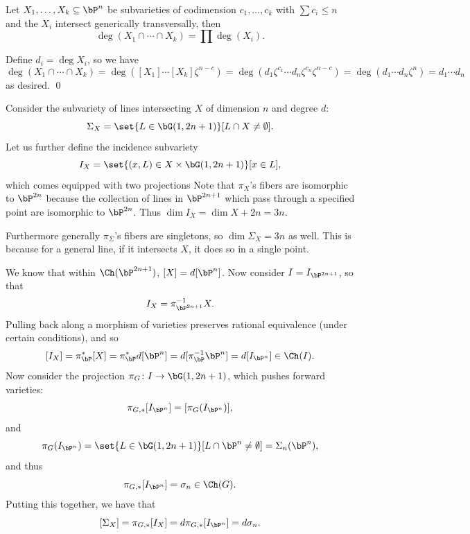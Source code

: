 \eproof

\bcoro[title={B\'ezout}]

    Let $X_1,\dots,X_k\subseteq\bP^n$ be subvarieties of codimension $c_1,\dots,c_k$ with $\sum c_i\leq n$ and the $X_i$ intersect
    generically transversally, then
    $$ \deg(X_1\cap\cdots\cap X_k) = \prod\deg(X_i) . $$

\ecoro

\bproof

    Define $d_i=\deg X_i$, so we have
    $$ \deg(X_1\cap\cdots\cap X_k) = \deg([X_1]\cdots[X_k]\zeta^{n-c}) =
    \deg(d_1\zeta^{c_1}\cdots d_n\zeta^{c_n}\zeta^{n-c}) = \deg(d_1\cdots d_n\zeta^n) = d_1\cdots d_n $$
    as desired.
    \qed

\eproof

Consider the subvariety of lines intersecting $X$ of dimension $n$ and degree $d$:
$$ \Sigma_X = \set{L\in\bG(1,2n+1)}[L\cap X\neq\emptyset] . $$
Let us further define the incidence subvariety
$$ I_X = \set{(x,L)\in X\times\bG(1,2n+1)}[x\in L] , $$
which comes equipped with two projections
{\def\diagrowheight{0pt}}
Note that $\pi_X$'s fibers are isomorphic to $\bP^{2n}$ because the collection of lines in $\bP^{2n+1}$ which
pass through a specified point are isomorphic to $\bP^{2n}$.
Thus $\dim I_X=\dim X+2n=3n$.

Furthermore generally $\pi_\Sigma$'s fibers are singletons, so $\dim\Sigma_X=3n$ as well.
This is because for a general line, if it intersects $X$, it does so in a single point.

We know that within $\Ch(\bP^{2n+1})$, $[X]=d[\bP^n]$.
Now consider $I=I_{\bP^{2n+1}}$, so that
$$ I_X = \pi_{\bP^{2n+1}}^{-1}X . $$
Pulling back along a morphism of varieties preserves rational equivalence (under certain conditions), and so
$$ [I_X] = \pi_\bP^*[X] = \pi_\bP^* d[\bP^n] = d[\pi_\bP^{-1}\bP^n] = d[I_{\bP^n}] \in \Ch(I) . $$
Now consider the projection $\pi_G\colon I\to\bG(1,2n+1)$, which pushes forward varieties:
$$ \pi_{G,*}[I_{\bP^n}] = [\pi_G(I_{\bP^n})] , $$
and
$$ \pi_G(I_{\bP^n}) = \set{L\in\bG(1,2n+1)}[L\cap\bP^n\neq\emptyset] = \Sigma_n(\bP^n) , $$
and thus
$$ \pi_{G,*}[I_{\bP^n}] = \sigma_n \in \Ch(G) . $$
Putting this together, we have that
$$ [\Sigma_X] = \pi_{G,*}[I_X] = d\pi_{G,*}[I_{\bP^n}] = d\sigma_n . $$


